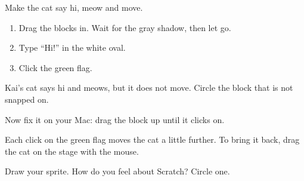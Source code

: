 \begin{exercise}
Make the cat say hi, meow and move.
\begin{enumerate}[leftmargin=1.4em,itemsep=2pt]
  \item Drag the blocks in. Wait for the gray shadow, then let go.
  \item Type \enquote{Hi!} in the white oval.
  \item Click the green flag.
\end{enumerate}
\begin{center}
\begin{scratch}[scale=0.9]
\end{scratch}
\end{center}
\end{exercise}

\begin{exercise}
Kai's cat says hi and meows, but it does not move. Circle the block that is not snapped on.
\begin{center}
\begin{scratch}[scale=0.9]
\end{scratch}

\vspace{0.4cm}
\begin{scratch}[scale=0.9]
\end{scratch}
\end{center}
Now fix it on your Mac: drag the block up until it clicks on.
\end{exercise}

\begin{grownup}
Each click on the green flag moves the cat a little further. To bring it back, drag the cat on the stage with the mouse.
\end{grownup}

\begin{vocab}
\end{vocab}

\begin{reflection}
Draw your sprite. How do you feel about Scratch? Circle one.

\begin{center}
\Huge\faSmile[regular]\qquad\faMeh[regular]\qquad\faFrown[regular]
\end{center}
\answerspace{3.5cm}
\end{reflection}
